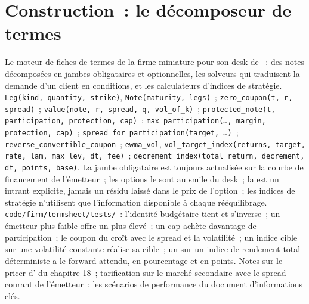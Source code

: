\section{Construction~: le décomposeur de termes}\label{bld:dv:the-structured-products-business:termsheet}

\begin{build}
 Le moteur de fiches de termes de la firme miniature pour son desk de ~: des notes décomposées en jambes obligataires et optionnelles, les solveurs qui
traduisent la demande d'un client en conditions, et les calculateurs d'indices de stratégie.
 \texttt{Leg(kind, quantity, strike)}, \texttt{Note(maturity, legs)}~; \texttt{zero\_coupon(t, r, spread)}~;
\texttt{value(note, r, spread, q, vol\_of\_k)}~; \texttt{protected\_note(t, participation, protection, cap)}~;
\texttt{max\_participation(\ldots, margin, protection, cap)}~; \texttt{spread\_for\_participation(target, \ldots)}~;
\texttt{reverse\_convertible\_coupon}~; \texttt{ewma\_vol}, \texttt{vol\_target\_index(returns, target, rate, lam, max\_lev, dt, fee)}~;
\texttt{decrement\_index(total\_return, decrement, dt, points, base)}.
 La jambe obligataire est toujours actualisée sur la courbe de financement de l'émetteur~; les options le sont au smile du desk~; la  est un intrant explicite,
jamais un résidu laissé dans le prix de l'option~; les indices de stratégie n'utilisent que l'information disponible à chaque rééquilibrage.
 \texttt{code/firm/termsheet/tests/}~: l'identité budgétaire tient et s'inverse~; un émetteur plus faible offre
un  plus élevé~; un cap achète davantage de participation~; le coupon du  croît avec le spread et la volatilité~; un indice cible sur une
volatilité constante réalise sa cible~; un  sur un indice de rendement total déterministe a le forward attendu, en pourcentage et
en points.
 Notes sur le pricer d' du chapitre 18~; tarification sur le marché secondaire avec le spread courant de l'émetteur~; les
scénarios de performance du document d'informations clés.
\end{build}

